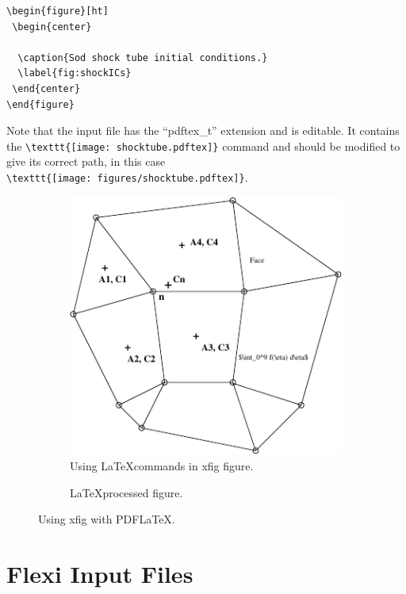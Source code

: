 \begin{appendices}
\begin{enumerate}
\begin{verbatim}
\begin{figure}[ht]
 \begin{center}
  
  \caption{Sod shock tube initial conditions.}
  \label{fig:shockICs}
 \end{center}
\end{figure}
\end{verbatim}

\noindent Note that the input file has the  ``pdftex\_t'' extension and is editable.  It contains the \verb|\texttt{[image: shocktube.pdftex]}| command and should be modified to give its correct path, in this case \\ \verb|\texttt{[image: figures/shocktube.pdftex]}|.
\end{enumerate}

\begin{figure}[h!]
\centering
\begin{subfigure}[h!]{\linewidth}
\centering
\includegraphics[scale=1.]{figures/CentPDF.pdf}
\caption{Using \LaTeX commands in xfig figure.}
  \label{fig:xfigRaw}
\end{subfigure}

\bigskip

\begin{subfigure}[h!]{\linewidth}
\centering

\caption{\LaTeX processed figure.}
\label{fig:xfigLatex}
\end{subfigure}%
\caption{Using xfig with PDF\LaTeX.}
\end{figure}

\section{Flexi Input Files}\label{Asec:flexiinput}


\end{appendices}
